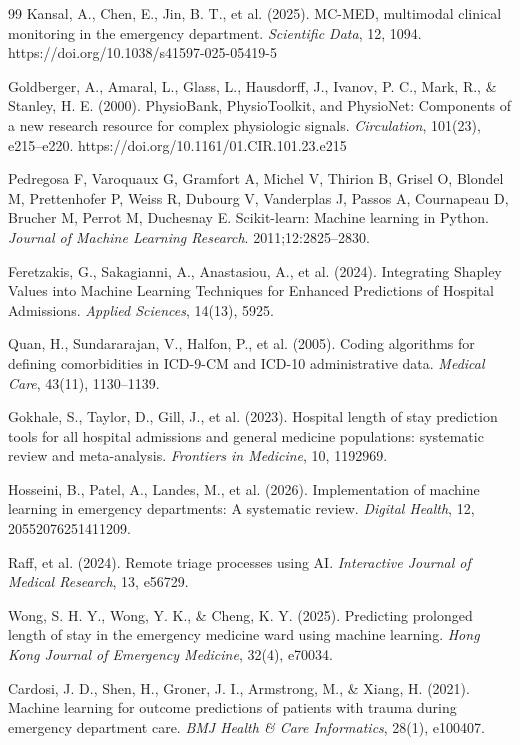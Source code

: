 \documentclass[harvard,article]{frontiersinFPHY_FAMS}
\begin{document}
\begin{thebibliography}{99}
 Kansal, A., Chen, E., Jin, B. T., et al. (2025). MC-MED, multimodal clinical monitoring in the emergency department. \textit{Scientific Data}, 12, 1094. https://doi.org/10.1038/s41597-025-05419-5

 Goldberger, A., Amaral, L., Glass, L., Hausdorff, J., Ivanov, P. C., Mark, R., \& Stanley, H. E. (2000). PhysioBank, PhysioToolkit, and PhysioNet: Components of a new research resource for complex physiologic signals. \textit{Circulation}, 101(23), e215--e220. https://doi.org/10.1161/01.CIR.101.23.e215

 Pedregosa F, Varoquaux G, Gramfort A, Michel V, Thirion B, Grisel O, Blondel M, Prettenhofer P, Weiss R, Dubourg V, Vanderplas J, Passos A, Cournapeau D, Brucher M, Perrot M, Duchesnay E. Scikit-learn: Machine learning in Python. \textit{Journal of Machine Learning Research}. 2011;12:2825--2830.

 Feretzakis, G., Sakagianni, A., Anastasiou, A., et al. (2024). Integrating Shapley Values into Machine Learning Techniques for Enhanced Predictions of Hospital Admissions. \textit{Applied Sciences}, 14(13), 5925.

 Quan, H., Sundararajan, V., Halfon, P., et al. (2005). Coding algorithms for defining comorbidities in ICD-9-CM and ICD-10 administrative data. \textit{Medical Care}, 43(11), 1130--1139.

 Gokhale, S., Taylor, D., Gill, J., et al. (2023). Hospital length of stay prediction tools for all hospital admissions and general medicine populations: systematic review and meta-analysis. \textit{Frontiers in Medicine}, 10, 1192969.

 Hosseini, B., Patel, A., Landes, M., et al. (2026). Implementation of machine learning in emergency departments: A systematic review. \textit{Digital Health}, 12, 20552076251411209.

 Raff, et al. (2024). Remote triage processes using AI. \textit{Interactive Journal of Medical Research}, 13, e56729.

 Wong, S. H. Y., Wong, Y. K., \& Cheng, K. Y. (2025). Predicting prolonged length of stay in the emergency medicine ward using machine learning. \textit{Hong Kong Journal of Emergency Medicine}, 32(4), e70034.

 Cardosi, J. D., Shen, H., Groner, J. I., Armstrong, M., \& Xiang, H. (2021). Machine learning for outcome predictions of patients with trauma during emergency department care. \textit{BMJ Health \& Care Informatics}, 28(1), e100407.

\end{thebibliography}

\end{document}
